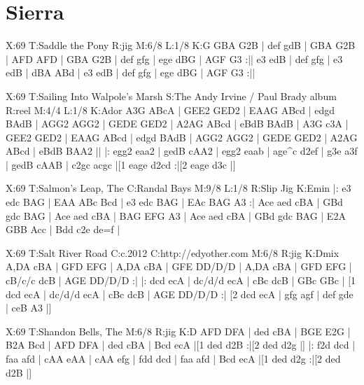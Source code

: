 \documentclass{article}
\begin{document}
\section{Sierra}

\begin{abc}[name]
X:69
T:Saddle the Pony
R:jig
M:6/8
L:1/8
K:G
GBA G2B | def gdB | GBA G2B | AFD AFD |
GBA G2B | def gfg | ege dBG | AGF G3 :||
e3 edB | def gfg | e3 edB | dBA ABd |
e3 edB | def gfg | ege dBG | AGF G3 :||
\end{abc}

\begin{abc}[name]
X:69
T:Sailing Into Walpole's Marsh
S:The Andy Irvine / Paul Brady album
R:reel
M:4/4
L:1/8
K:Ador
A3G ABcA | GEE2 GED2 | EAAG ABcd | edgd BAdB |
AGG2 AGG2 | GEDE GED2 | A2AG ABcd | eBdB BAdB |
A3G c3A | GEE2 GED2 | EAAG ABcd | edgd BAdB |
AGG2 AGG2 | GEDE GED2 | A2AG ABcd | eBdB BAA2 ||
|: egg2 eaa2 | gedB cAA2 | egg2 eaab | age^c d2ef |
g3e a3f | gedB cAAB | c2gc acgc |[1 eage d2cd :|[2 eage d3c |]
\end{abc}

\begin{abc}[name]
X:69
T:Salmon's Leap, The
C:Randal Bays
M:9/8
L:1/8
R:Slip Jig
K:Emin
|: e3 edc BAG | EAA ABc Bcd | e3 edc BAG | EAc BAG A3 :|
Ace aed cBA | GBd gdc BAG | Ace aed cBA | BAG EFG A3 |
Ace aed cBA | GBd gdc BAG | E2A GBB Acc | Bdd c2e de=f |
\end{abc}

\begin{abc}[name]
X:69
T:Salt River Road
C:c.2012
C:http://edyother.com
M:6/8
R:jig
K:Dmix
A,DA cBA | GFD EFG | A,DA cBA | GFE DD/D/D |
A,DA cBA | GFD EFG | cB/c/c dcB | AGE DD/D/D :|
|: dcd ecA | dc/d/d ecA | cBc dcB | GBc GBc |
[1 dcd ecA | dc/d/d ecA | cBc dcB | AGE DD/D/D :|
[2 dcd ecA | gfg agf | def gde | ceB A3 |]
\end{abc}

\begin{abc}[name]
X:69
T:Shandon Bells, The
M:6/8
R:jig
K:D
AFD DFA | ded cBA | BGE E2G | B2A Bcd |
AFD DFA | ded cBA | Bcd ecA |[1 ded d2B :|[2 ded d2g |]
|: f2d dcd | faa afd | cAA eAA | cAA efg |
fdd dcd | faa afd | Bcd ecA |[1 ded d2g :|[2 ded d2B |]
\end{abc}
\end{document}
